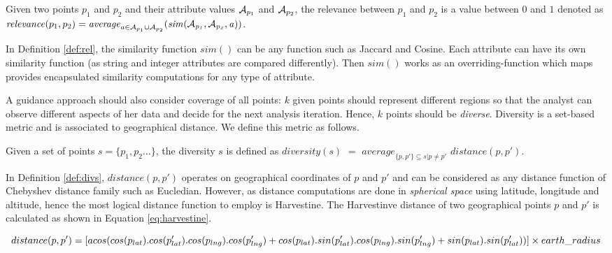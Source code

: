 \begin{definition}[Relevance]
Given two points $p_1$ and $p_2$ and their attribute values ${\cal A}_{p_1}$ and ${\cal A}_{p_2}$, the relevance between $p_1$ and $p_2$ is a value between $0$ and $1$ denoted as $\mathit{relevance}(p_1,p_2) = \mathit{average}_{a \in {\cal A}_{p_1} \cup {\cal A}_{p_2}}(\mathit{sim({\cal A}_{p_1}, {\cal A}_{p_2}, a)})$.
\label{def:rel}
\end{definition}

In Definition \ref{def:rel}, the similarity function $\mathit{sim}()$ can be any function such as Jaccard and Cosine. Each attribute can have its own similarity function (as string and integer attributes are compared differently). Then $\mathit{sim}()$ works as an overriding-function which maps provides encapsulated similarity computations for any type of attribute.

\vspace{5pt}
 A guidance approach should also consider coverage of all points: $k$ given points should represent different regions so that the analyst can observe different aspects of her data and decide for the next analysis iteration. Hence, $k$ points should be {\em diverse}. Diversity is a set-based metric and is associated to geographical distance. We define this metric as follows.

\begin{definition}
Given a set of points $s = \{ p_1, p_2 \dots \}$, the diversity $s$ is defined as $\mathit{diversity}(s)$ $=$ $\mathit{average}_{\{p, p'\} \subseteq s | p \neq p' }$ $\mathit{distance}(p,p')$.
\label{def:divs}
\end{definition}

In Definition \ref{def:divs}, $\mathit{distance}(p,p')$ operates on geographical coordinates of $p$ and $p'$ and can be considered as any distance function of Chebyshev distance family such as Eucledian. However, as distance computations are done in {\em spherical space} using latitude, longitude and altitude, hence the most logical distance function to employ is Harvestine. The Harvestinve distance of two geographical points $p$ and $p'$ is calculated as shown in Equation \ref{eq:harvestine}.

\begin{dmath}
\label{eq:harvestine}
distance(p,p') = [ acos(cos(p_{lat}) . cos(p'_{lat}) . cos(p_{lng}) . cos(p'_{lng})\\ + cos(p_{lat}) . sin(p'_{lat}). cos(p_{lng}) . sin(p'_{lng}) + sin(p_{lat}) . sin(p'_{lat})) ] \times earth\_radius
\end{dmath}

